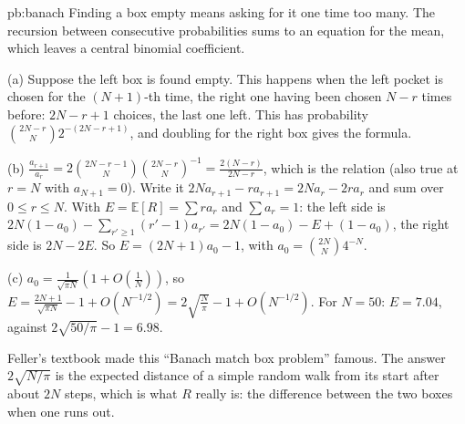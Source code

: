 \begin{solution}{pb:banach}
\idea Finding a box empty means asking for it one time too many. The recursion between consecutive probabilities sums to an equation for the mean, which leaves a central
binomial coefficient.

\writeup (a) Suppose the left box is found empty. This happens when the left pocket is chosen for the $(N+1)$-th time, the right one having been chosen $N-r$ times before: $2N-r+1$
choices, the last one left. This has probability $\binom{2N-r}N2^{-(2N-r+1)}$, and doubling for the right box gives the formula.

(b) $\frac{a_{r+1}}{a_r}=2\binom{2N-r-1}N\binom{2N-r}N^{-1}=\frac{2(N-r)}{2N-r}$, which is the relation (also true at $r=N$ with $a_{N+1}=0$). Write it $2Na_{r+1}-ra_{r+1}=2Na_r-2ra_r$ and sum over
$0\le r\le N$. With $E=\mathbb E[R]=\sum ra_r$ and $\sum a_r=1$: the left side is $2N(1-a_0)-\sum_{r'\ge1}(r'-1)a_{r'}=2N(1-a_0)-E+(1-a_0)$, the right side is $2N-2E$. So $E=(2N+1)a_0-1$, with
$a_0=\binom{2N}N4^{-N}$.

(c) $a_0=\frac1{\sqrt{\pi N}}(1+O(\frac1N))$, so $E=\frac{2N+1}{\sqrt{\pi N}}-1+O(N^{-1/2})=2\sqrt{\frac N\pi}-1+O(N^{-1/2})$. For $N=50$: $E=7.04$, against $2\sqrt{50/\pi}-1=6.98$.

\leads Feller's textbook made this ``Banach match box problem'' famous. The answer $2\sqrt{N/\pi}$ is the expected distance of a simple random walk from its start after about $2N$ steps,
which is what $R$ really is: the difference between the two boxes when one runs out.
\end{solution}

